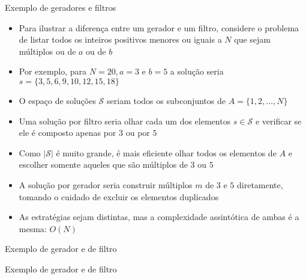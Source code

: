 \begin{frame}[fragile]{Exemplo de geradores e filtros}

    \begin{itemize}
        \item Para ilustrar a diferença entre um gerador e um filtro, considere o problema de
            listar todos os inteiros positivos menores ou iguais a $N$ que sejam múltiplos ou
            de $a$ ou de $b$

        \item Por exemplo, para $N = 20, a = 3$ e $b = 5$ a solução seria 
            $s = \lbrace 3, 5, 6, 9, 10, 12, 15, 18\rbrace$

        \item O espaço de soluções $\mathcal{S}$ seriam todos os subconjuntos de 
            $A = \lbrace 1, 2, \ldots, N\rbrace$

        \item Uma solução por filtro seria olhar cada um dos elementos $s\in \mathcal{S}$ e 
            verificar se ele é composto apenas por $3$ ou por $5$

        \item Como $|\mathcal{S}|$ é muito grande, é mais eficiente olhar todos os elementos de
            $A$ e escolher somente aqueles que são múltiplos de $3$ ou $5$
 
        \item A solução por gerador seria construir múltiplos $m$ de $3$ e $5$ diretamente, 
            tomando o cuidado de excluir os elementos duplicados

        \item As estratégias sejam distintas, mas a complexidade assintótica de ambas é a 
            mesma: $O(N)$
    \end{itemize}

\end{frame}

\begin{frame}[fragile]{Exemplo de gerador e de filtro}
\end{frame}

\begin{frame}[fragile]{Exemplo de gerador e de filtro}
\end{frame}
